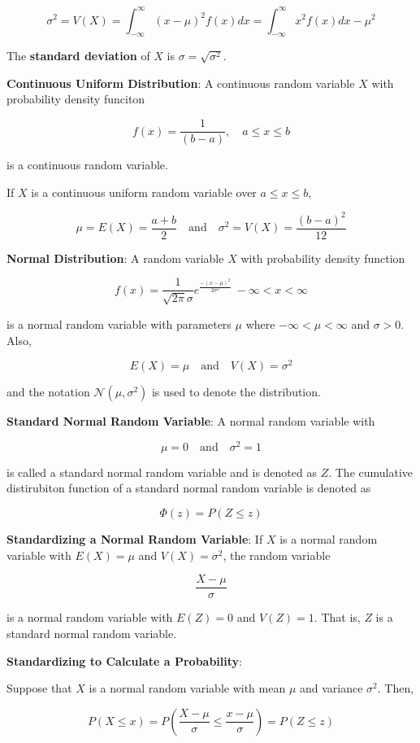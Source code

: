 \documentclass{article}
\begin{document}
\[\sigma^2=V(X)=\int_{-\infty}^{\infty}(x-\mu)^2f(x)dx=\int_{-\infty}^{\infty}x^2f(x)dx-\mu^2\]

The \textbf{standard deviation} of $X$ is $\sigma=\sqrt{\sigma^2}$.

\noindent\textbf{\color{blue}Continuous Uniform Distribution}: A continuous random variable $X$ with probability density funciton

\[f(x)=\frac{1}{(b-a)},\quad a\le x\le b\]

is a continuous random variable.

If $X$ is a continuous uniform random variable over $a\le x\le b$,

\[\mu=E(X)=\frac{a+b}{2}\quad\text{and}\quad\sigma^2=V(X)=\frac{(b-a)^2}{12}\]

\noindent\textbf{\color{blue}Normal Distribution}: A random variable $X$ with probability density function

\[f(x)=\frac{1}{\sqrt{2\pi}\sigma}e^{\frac{-(x-\mu)^2}{2\sigma^2}}\ -\infty<x<\infty\]

is a normal random variable with parameters $\mu$ where $-\infty<\mu<\infty$ and $\sigma>0$. Also,

\[E(X)=\mu\quad\text{and}\quad V(X)=\sigma^2\]

and the notation $\mathcal{N}(\mu,\sigma^2)$ is used to denote the distribution.

\noindent\textbf{\color{blue}Standard Normal Random Variable}: A normal random variable with

\[\mu=0\quad\text{and}\quad\sigma^2=1\]

is called a standard normal random variable and is denoted as $Z$. The cumulative distirubiton function of a standard normal random variable is denoted as

\[\Phi(z)=P(Z\le z)\]

\noindent\textbf{\color{red}Standardizing a Normal Random Variable}: If $X$ is a normal random variable with $E(X)=\mu$ and $V(X)=\sigma^2$, the random variable

\[\frac{X-\mu}{\sigma}\]

is a normal random variable with $E(Z)=0$ and $V(Z)=1$. That is, $Z$ is a standard normal random variable.

\noindent\textbf{\color{red}Standardizing to Calculate a Probability}:

Suppose that $X$ is a normal random variable with mean $\mu$ and variance $\sigma^2$. Then,

\[P(X\le x)=P(\frac{X-\mu}{\sigma}\le\frac{x-\mu}{\sigma})=P(Z\le z)\]
\end{document}
